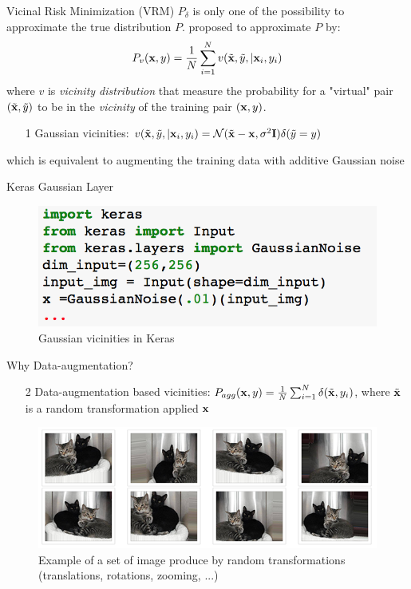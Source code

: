\documentclass[xcolor=pdftex,dvipsnames,table,mathserif]{beamer}
\begin{document}
\begin{frame}{Vicinal Risk Minimization (VRM)}
$P_{\delta}$ is only one of the possibility to approximate the true distribution $P$. \cite{chapelle2001vicinal} proposed to approximate $P$ by:
\begin{equation*}
P_{v}(\mathbf{x},y) = \frac{1}{N}\sum_{i=1}^{N}v(\tilde{\mathbf{x}},\tilde{y}, |\mathbf{x}_i,y_i)
\end{equation*}
where $v$ is \emph{vicinity distribution} that measure the probability for a "virtual" pair $(\tilde{\mathbf{x}},\tilde{y})$ to be in the \emph{vicinity} of the training pair $(\mathbf{x},y)$. \pause
\begin{enumerate}
\item[1]  Gaussian vicinities: $v(\tilde{\mathbf{x}},\tilde{y}, |\mathbf{x}_i,y_i)=\mathcal{N}(\tilde{\mathbf{x}}-\mathbf{x},\sigma^2\mathbf{I})\delta(\tilde{y}=y)$
\end{enumerate}
\pause
\alert{which is equivalent to augmenting the training data with additive Gaussian noise}
\end{frame}

\begin{frame}{Keras Gaussian Layer}
\begin{figure}
\includegraphics[width=.95 \columnwidth]{../graphics/GaussianNoiseLayer}
\caption{Gaussian vicinities in Keras}
\end{figure}
\end{frame}

\begin{frame}{Why Data-augmentation?}
\begin{enumerate}
\item[2]  Data-augmentation based vicinities: $P_{agg}(\mathbf{x},y) = \frac{1}{N}\sum_{i=1}^{N}\delta(\tilde{\mathbf{x}},y_i)$, where $\tilde{\mathbf{x}}$ is a random transformation applied $\mathbf{x}$
\end{enumerate}
\begin{figure}
\includegraphics[width=.99 \columnwidth]{../graphics/cat_data_augmentation}
\caption{Example of a set of image produce by random transformations (translations, rotations, zooming, ...)}
\end{figure}
\end{frame}
\end{document}
